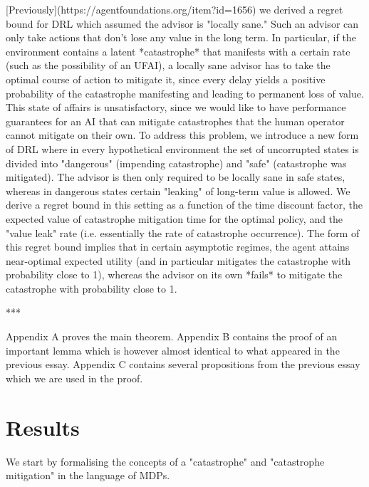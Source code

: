\documentclass[a4paper]{article}
\begin{document}
[Previously](https://agentfoundations.org/item?id=1656) we derived a regret bound for DRL which assumed the advisor is "locally sane." Such an advisor can only take actions that don't lose any value in the long term. In particular, if the environment contains a latent *catastrophe* that manifests with a certain rate (such as the possibility of an UFAI), a locally sane advisor has to take the optimal course of action to mitigate it, since every delay yields a positive probability of the catastrophe manifesting and leading to permanent loss of value. This state of affairs is unsatisfactory, since we would like to have performance guarantees for an AI that can mitigate catastrophes that the human operator cannot mitigate on their own. To address this problem, we introduce a new form of DRL where in every hypothetical environment the set of uncorrupted states is divided into "dangerous" (impending catastrophe) and "safe" (catastrophe was mitigated). The advisor is then only required to be locally sane in safe states, whereas in dangerous states certain "leaking" of long-term value is allowed. We derive a regret bound in this setting as a function of the time discount factor, the expected value of catastrophe mitigation time for the optimal policy, and the "value leak" rate (i.e. essentially the rate of catastrophe occurrence). The form of this regret bound implies that in certain asymptotic regimes, the agent attains near-optimal expected utility (and in particular mitigates the catastrophe with probability close to 1), whereas the advisor on its own *fails* to mitigate the catastrophe with probability close to 1. %

***

Appendix A proves the main theorem. Appendix B contains the proof of an important lemma which is however almost identical to what appeared in the previous essay. Appendix C contains several propositions from the previous essay which we are used in the proof.

\section{Results}

We start by formalising the concepts of a "catastrophe" and "catastrophe mitigation" in the language of MDPs.
\end{document}
